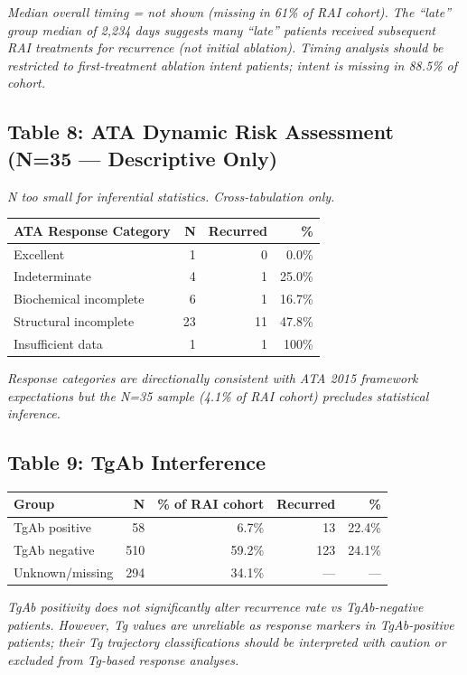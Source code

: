 \documentclass{article}
\begin{document}
\vspace{0.3cm}
\noindent\textit{Median overall timing = not shown (missing in 61\% of RAI cohort).
The ``late'' group median of 2,234 days suggests many ``late'' patients received subsequent RAI
treatments for recurrence (not initial ablation). Timing analysis should be restricted to
first-treatment ablation intent patients; intent is missing in 88.5\% of cohort.}

\subsection*{Table 8: ATA Dynamic Risk Assessment (N=35 --- Descriptive Only)}
\textit{N too small for inferential statistics. Cross-tabulation only.}

\begin{tabular}{lrrr}
\toprule
ATA Response Category & N & Recurred & \% \\
\midrule
Excellent              &  1 &  0 &  0.0\% \\
Indeterminate          &  4 &  1 & 25.0\% \\
Biochemical incomplete &  6 &  1 & 16.7\% \\
Structural incomplete  & 23 & 11 & 47.8\% \\
Insufficient data      &  1 &  1 & 100\% \\
\bottomrule
\end{tabular}

\vspace{0.3cm}
\noindent\textit{Response categories are directionally consistent with ATA 2015 framework expectations
but the N=35 sample (4.1\% of RAI cohort) precludes statistical inference.}

\subsection*{Table 9: TgAb Interference}
\begin{tabular}{lrrrr}
\toprule
Group & N & \% of RAI cohort & Recurred & \% \\
\midrule
TgAb positive  & 58 & 6.7\% & 13 & 22.4\% \\
TgAb negative  & 510 & 59.2\% & 123 & 24.1\% \\
Unknown/missing & 294 & 34.1\% & --- & --- \\
\bottomrule
\end{tabular}

\vspace{0.3cm}
\noindent\textit{TgAb positivity does not significantly alter recurrence rate vs TgAb-negative patients.
However, Tg values are unreliable as response markers in TgAb-positive patients; their Tg trajectory
classifications should be interpreted with caution or excluded from Tg-based response analyses.}
\end{document}
